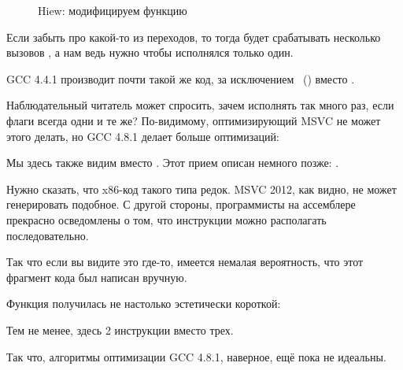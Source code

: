 \begin{figure}[H]
\centering
{}
\caption{Hiew: модифицируем функцию }
\label{fig:jcc_hiew_2}
\end{figure}

Если забыть про какой-то из переходов, то тогда будет срабатывать несколько вызовов \printf, 
а нам ведь нужно чтобы исполнялся только один.


\NonOptimizing GCC 4.4.1 производит почти такой же код, за исключением \puts~() вместо \printf.


Наблюдательный читатель может спросить, зачем исполнять \CMP так много раз,
если флаги всегда одни и те же?
По-видимому, оптимизирующий MSVC не может этого делать, но GCC 4.8.1 делает больше оптимизаций:



Мы здесь также видим  вместо .
Этот прием описан немного позже: .

Нужно сказать, что x86-код такого типа редок.
MSVC 2012, как видно, не может генерировать подобное.
С другой стороны, программисты на ассемблере прекрасно осведомлены о том,
что инструкции  можно располагать последовательно.

Так что если вы видите это где-то, имеется немалая вероятность, что этот фрагмент кода был написан вручную.

Функция  получилась не настолько эстетически короткой:



Тем не менее, здесь 2 инструкции  вместо трех.

Так что, алгоритмы оптимизации GCC 4.8.1, наверное, ещё пока не идеальны.
